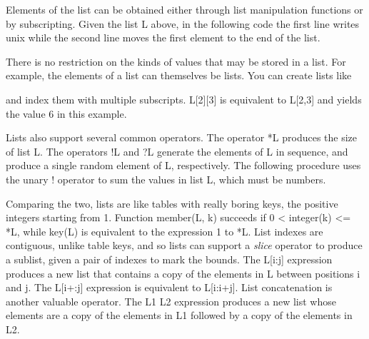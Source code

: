 Elements of the list can be obtained either through list manipulation
functions or by subscripting. Given the list \textsf{L} above, in the
following code the first line writes
\textsf{{\textquotedbl}unix{\textquotedbl}} while the second line moves
the first element to the end of the list.


There is no restriction on the kinds of values that may be stored in a
list. For example, the elements of a list can themselves be lists. You
can create lists like


\noindent and index them with multiple subscripts. \textsf{L[2][3]} is
equivalent to \textsf{L[2,3]} and yields the value 6 in this example. 

Lists also support several common operators. The operator
\textsf{*L} produces the size of list \textsf{L}.
The operators \textsf{!L} and \textsf{?L} generate the elements of
\textsf{L} in sequence, and produce a single random element of
\textsf{L}, respectively. The following procedure uses the unary
\textsf{!} operator to sum the values in list \textsf{L}, which must be
numbers.


Comparing the two, lists are like tables with really boring keys, the
positive integers starting from 1. Function \textsf{member(L, k)}
succeeds if \textsf{0 {\textless} integer(k) {\textless}= *L}, while
\textsf{key(L)} is equivalent to the expression \textsf{1 to *L}. List
indexes are contiguous, unlike table keys, and so lists can support a
\textit{slice} operator to produce a sublist,
given a pair of indexes to mark the bounds. The \textsf{L[i:j]}
expression produces a new list that contains a copy of the elements in
\textsf{L} between positions \textsf{i} and \textsf{j}. The
\textsf{L[i+:j]} expression is equivalent to \textsf{L[i:i+j]}. List
concatenation is another valuable operator. The \textsf{L1
{\textbar}{\textbar}{\textbar} L2} expression produces a new list whose
elements are a copy of the elements in \textsf{L1} followed by a copy
of the elements in \textsf{L2}.

